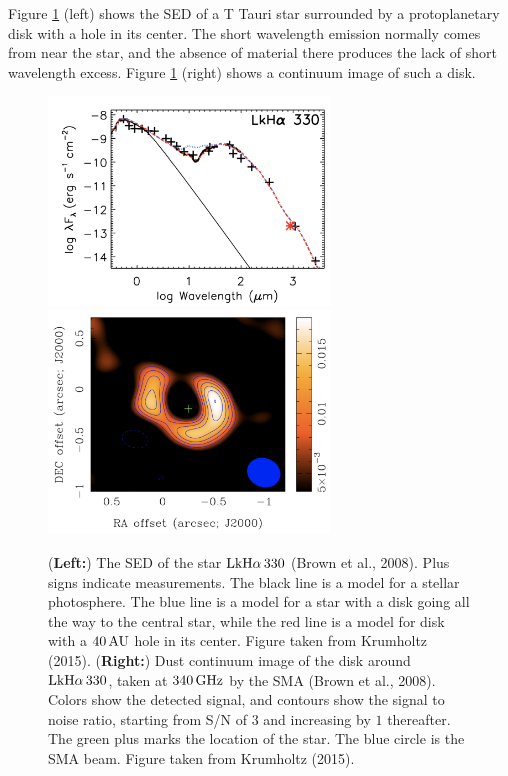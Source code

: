 \documentclass[a4paper,10pt]{article}
\begin{document}
{\noindent}Figure \ref{fig:lkha330} (left) shows the SED of a T Tauri star surrounded by a protoplanetary disk with a hole in its center. The short wavelength emission normally comes from near the star, and the absence of material there produces the lack of short wavelength excess. Figure \ref{fig:lkha330} (right) shows a continuum image of such a disk.

\begin{figure}[h]
    \centering
    \includegraphics[width=7.5cm]{figures/LkHa330.png}
    \includegraphics[width=7.5cm]{figures/LkHa330_cont.png}
    \caption{\footnotesize{(\textbf{Left:}) The SED of the star ${\rm LkH}\alpha\,330$ (Brown et al., 2008). Plus signs indicate measurements. The black line is a model for a stellar photosphere. The blue line is a model for a star with a disk going all the way to the central star, while the red line is a model for disk with a $40\,{\rm AU}$ hole in its center. Figure taken from Krumholtz (2015). (\textbf{Right:}) Dust continuum image of the disk around ${\rm LkH}\alpha\,330$, taken at $340\,{\rm GHz}$ by the SMA (Brown et al., 2008). Colors show the detected signal, and contours show the signal to noise ratio, starting from S/N of $3$ and increasing by $1$ thereafter. The green plus marks the location of the star. The blue circle is the SMA beam. Figure taken from Krumholtz (2015).}}
    \label{fig:lkha330}
\end{figure}
\end{document}
